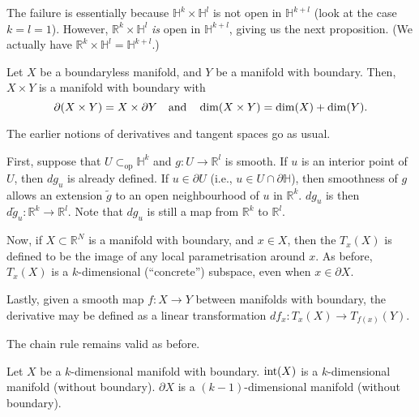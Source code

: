\documentclass[12pt]{article}
\newcommand{\opsub}{\subset_{\operatorname{op}}}
\begin{document}
The failure is essentially because $\mathbb{H}^{k} \times \mathbb{H}^{l}$ is not open in $\mathbb{H}^{k + l}$ (look at the case $k = l = 1$). However, $\mathbb{R}^{k} \times \mathbb{H}^{l}$ \emph{is} open in $\mathbb{H}^{k + l}$, giving us the next proposition. (We actually have $\mathbb{R}^{k} \times \mathbb{H}^{l} = \mathbb{H}^{k + l}$.)

\begin{prop}
	Let $X$ be a boundaryless manifold, and $Y$ be a manifold with boundary. \newline
	Then, $X \times Y$ is a manifold with boundary with
	\begin{equation*} 
		\partial(X \times Y) = X \times \partial Y \quad\text{and}\quad \dim(X \times Y) = \dim(X) + \dim(Y).
	\end{equation*}
\end{prop}

The earlier notions of derivatives and tangent spaces go as usual.

First, suppose that $U \opsub \mathbb{H}^{k}$ and $g : U \to \mathbb{R}^{l}$ is smooth. If $u$ is an interior point of $U$, then $dg_{u}$ is already defined. If $u \in \partial U$ (i.e., $u \in U \cap \partial \mathbb{H}$), then smoothness of $g$ allows an extension $\widetilde{g}$ to an open neighbourhood of $u$ in $\mathbb{R}^{k}$. $dg_{u}$ is then $d\widetilde{g}_{u} : \mathbb{R}^{k} \to \mathbb{R}^{l}$. \newline
Note that $dg_{u}$ is still a map from $\mathbb{R}^{k}$ to $\mathbb{R}^{l}$.

Now, if $X \subset \mathbb{R}^{N}$ is a manifold with boundary, and $x \in X$, then the  $T_{x}(X)$ is defined to be the image of any local parametrisation around $x$. As before, $T_{x}(X)$ is a $k$-dimensional (``concrete'') subspace, even when $x \in \partial X$. 

Lastly, given a smooth map $f : X \to Y$ between manifolds with boundary, the derivative may be defined as a linear transformation $df_{x} : T_{x}(X) \to T_{f(x)}(Y)$.

The chain rule remains valid as before.

\begin{prop}
	Let $X$ be a $k$-dimensional manifold with boundary. \newline
	$\operatorname{int}(X)$ is a $k$-dimensional manifold (without boundary). \newline
	$\partial X$ is a $(k - 1)$-dimensional manifold (without boundary).
\end{prop}
\end{document}
